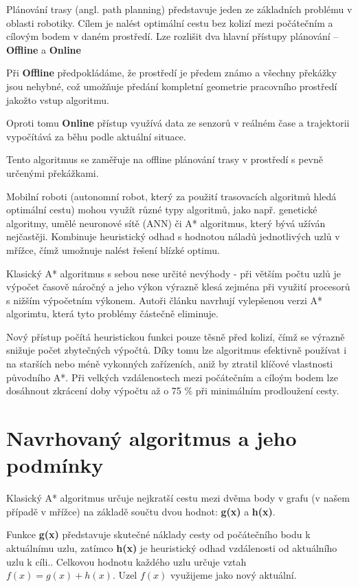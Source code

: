 \documentclass[10pt, a4paper]{article}
\begin{document}
Plánování trasy (angl. path planning) představuje jeden ze základních problému v oblasti robotiky. Cílem je nalést optimální cestu bez kolizí mezi počátečním a cílovým bodem v daném prostředí. Lze rozlišit dva hlavní přístupy plánování – \textbf{Offline} a \textbf{Online}

Při \textbf{Offline} předpokládáme, že prostředí je předem známo a všechny překážky jsou nehybné, což umožňuje předání kompletní geometrie pracovního prostředí jakožto vstup algoritmu.

Oproti tomu \textbf{Online} přístup využívá data ze senzorů v reálném čase a trajektorii vypočítává za běhu podle aktuální situace.

Tento algoritmus se zaměřuje na offline plánování trasy v prostředí s pevně určenými překážkami.

Mobilní roboti (autonomní robot, který za použití trasovacích algoritmů hledá optimální cestu) mohou využít různé typy algoritmů, jako např. genetické algoritmy, umělé neuronové sítě (ANN) či A* algoritmus, který bývá užíván nejčastěji. Kombinuje heuristický odhad s hodnotou náladů jednotlivých uzlů v mřížce, čímž umožnuje nalést řešení blízké optimu.

Klasický A* algoritmus s sebou nese určité nevýhody - při větším počtu uzlů je výpočet časově náročný a jeho výkon výrazně klesá zejména při využití procesorů s nižším výpočetním výkonem. Autoři článku navrhují vylepšenou verzi A* algorimtu, která tyto problémy částečně eliminuje.

Nový přístup počítá heuristickou funkci pouze těsně před kolizí, čímž se výrazně snižuje počet zbytečných výpočtů. Díky tomu lze algoritmus efektivně používat i na starších nebo méně vykonných zařízeních, aniž by ztratil klíčové vlastnosti původního A*.
Při velkých vzdálenostech mezi počátečním a cíloým bodem lze dosáhnout zkrácení doby výpočtu až o 75 \% při minimálním prodloužení cesty.


\section{Navrhovaný algoritmus a jeho podmínky}
Klasický A* algoritmus určuje nejkratší cestu mezi dvěma body v grafu (v našem případě v mřížce) na základě součtu dvou hodnot: \textbf{g(x)} a \textbf{h(x)}.

Funkce \textbf{g(x)} představuje skutečné náklady cesty od počátečního bodu k aktuálnímu uzlu, zatímco \textbf{h(x)} je heuristický odhad vzdálenosti od aktuálního uzlu k cíli.\cite{WikiAStar}.
Celkovou hodnotu každého uzlu určuje vztah $f(x) = g(x) + h(x)$.
Uzel $f(x)$ využijeme jako nový aktuální.
\end{document}

